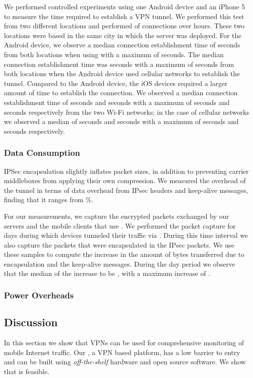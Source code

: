 We performed controlled experiments using one Android device and an iPhone 5 to measure the time required to establish a VPN tunnel. 
We performed this test from two different locations and performed  of connections over \tbdv{} hours. 
These two locations were based in the same city in which the server was deployed. 
For the Android device, we observe a median connection establishment time of  seconds from both locations when using \wifi with a maximum of  seconds. 
The median connection establishment time was  seconds with a maximum of  seconds from both locations when the Android device used cellular networks to establish the tunnel.
Compared to the Android device, the iOS devices required a larger amount of time to establish the connection. 
We observed a median connection establishment time of  seconds and  seconds with a maximum of  seconds and  seconds respectively from the two Wi-Fi networks; in the case of cellular networks  we observed a median of  seconds and  seconds with a maximum of  seconds and  seconds respectively. 

\subsubsection{Data Consumption}
IPSec encapsulation slightly inflates packet sizes, in addition to preventing carrier middleboxes from applying their own compression.
We measured the overhead of the tunnel in terms of data overhead from IPsec headers and keep-alive messages, finding that it
ranges from \%.

For our measurements, we capture the encrypted packets exchanged by our \platname servers and the mobile clients that use \platname. 
We performed the packet capture for  days during which  devices tunneled their traffic via  \platname. 
During this time interval we also capture the packets that were encapsulated in the IPsec packets. 
We use these samples to compute the increase in the amount of bytes transferred due to encapsulation and the keep-alive
messages. 
During the  day period we observe that the median of the increase to be , with a maximum increase of .

\subsubsection{Power Overheads}


\subsection{Discussion}

In this section we show that VPNs can be used for comprehensive monitoring of mobile Internet traffic.
Our \platname, a VPN based platform, has a low barrier to entry and can be built using \emph{off-the-shelf} hardware and open source software. 
We show that \platname is feasible.




